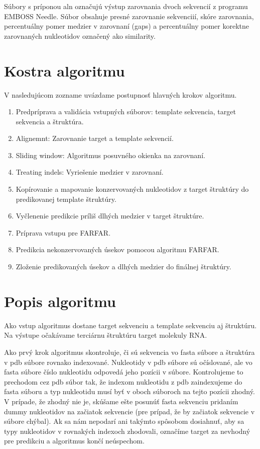 \indent Súbory s príponou aln označujú výstup zarovnania dvoch sekvencií z programu EMBOSS Needle. Súbor obsahuje presné zarovnanie sekvenciií, skóre zarovnania, percentuálny pomer medzier v zarovnaní (gaps) a percentuálny pomer korektne zarovnaných nukleotidov označený ako similarity. 


\section{Kostra algoritmu}

V nasledujúcom zozname uvázdame postupnosť hlavných krokov algoritmu.\label{3-kostra}
\begin{enumerate}
\item Predpríprava a validácia vstupných súborov: template sekvencia, target sekvencia a štruktúra.
\item Alignemnt: Zarovnanie target a template sekvencií.
\item Sliding window: Algoritmus posuvného okienka na zarovnaní.
\item Treating indels: Vyriešenie medzier v zarovnaní.
\item Kopírovanie a mapovanie konzervovaných nukleotidov z target štruktúry do predikovanej template štruktúry. \label{3-map}
\item Vyčlenenie predikcie príliš dlhých medzier v target štruktúre.
\item Príprava vstupu pre FARFAR.
\item Predikcia nekonzervovaných úsekov pomocou algoritmu FARFAR.
\item Zloženie predikovaných úsekov a dlhých medzier do finálnej štruktúry.
\end{enumerate}

\section{Popis algoritmu}
Ako vstup algoritmus dostane target sekvenciu a template sekvenciu aj štruktúru. Na výstupe očakávame terciárnu štruktúru target molekuly RNA.


\indent  Ako prvý krok algoritmus skontroluje, či sú sekvencia vo fasta súbore a štruktúra v pdb súbore rovnako indexované. Nukleotidy v pdb súbore sú očíslované, ale vo fasta súbore číslo nukleotidu odpovedá jeho pozícii v súbore. Kontrolujeme to prechodom cez pdb súbor tak, že indexom nukleotidu z pdb zaindexujeme do fasta súboru a typ nukleotidu musí byť v oboch súboroch na tejto pozícii zhodný. V prípade, že zhodný nie je, skúšame ešte posunúť fasta sekvenciu pridaním dummy nukleotidov na začiatok sekvencie (pre prípad, že by začiatok sekvencie v súbore chýbal). Ak sa nám nepodarí ani takýmto spôsobom dosiahnuť, aby sa typy nukleotidov v rovnakých indexoch zhodovali, označíme target za nevhodný pre predikciu a algoritmus končí neúspechom.


